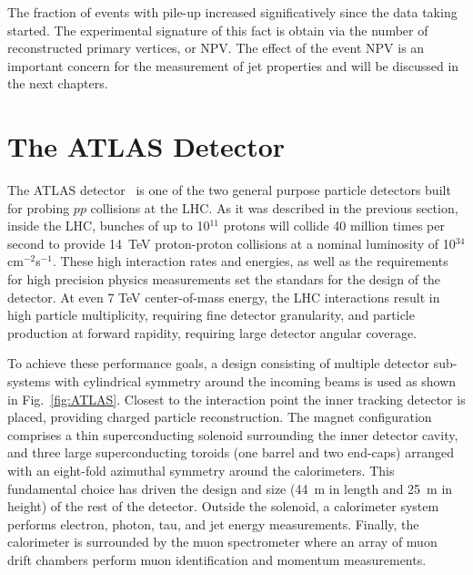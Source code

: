 The fraction of events with pile-up increased significatively since the data taking started. The experimental signature of this fact is obtain via the number of reconstructed primary vertices, or NPV. The effect of the event NPV is an important concern for the measurement of jet properties and will be discussed in the next chapters.


%
%
\section{The ATLAS Detector}


The ATLAS detector~\cite{ATLAS} is one of the two general purpose particle detectors built for probing $pp$ collisions at the LHC. As it was described in the previous section, inside the LHC, bunches of up to 10$^{11}$ protons will collide 40 million times per second to provide 14~TeV proton-proton collisions at a nominal luminosity of 10$^{34}$cm$^{-2}$s$^{-1}$. These high interaction rates and energies, as well as the requirements for high precision physics measurements set the standars for the design of the detector. At even 7 TeV center-of-mass energy, the LHC interactions result in high particle multiplicity, requiring fine detector granularity, and particle production at forward rapidity, requiring large detector angular coverage.

To achieve these performance goals, a design consisting of multiple detector sub-systems with cylindrical symmetry around the incoming beams is used as shown in Fig.~\ref{fig:ATLAS}. Closest to the interaction point the inner tracking detector is placed, providing charged particle reconstruction. The magnet configuration comprises a thin superconducting solenoid surrounding the inner detector cavity, and three large superconducting toroids (one barrel and two end-caps) arranged with an eight-fold azimuthal symmetry around the calorimeters. This fundamental choice has driven the design and size (44~m in length and 25~m in height) of the rest of the detector. Outside the solenoid, a calorimeter system performs electron, photon, tau, and jet energy measurements. Finally, the calorimeter is surrounded by the muon spectrometer where an array of muon drift chambers perform muon identification and momentum measurements.

